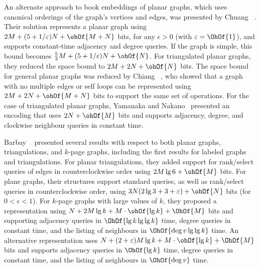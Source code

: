 {An alternate approach to book embeddings of planar graphs, which uses
canonical orderings of the graph's vertices and edges, was presented
by Chuang \etal~\cite{chuang_et_al_1998}.
Their solution represents a planar graph using
$2M + (5 + 1/\epsilon)N + \ohOf{M + N}$ bits, for any $\epsilon > 0$ 
(with $\epsilon = \OhOf{1}$), and supports constant-time adjacency 
and degree queries.
If the graph is simple, this bound becomes
$\frac{5}{3}M + (5 + 1/\epsilon)N + \ohOf{N}$. 
For triangulated planar graphs, they reduced the space
bound to $2M + 2N + \ohOf{N}$ bits.
The space bound for general planar graphs was reduced by Chiang
\etal~\cite{DBLP:journals/siamcomp/ChiangLL05}, who showed that a
graph with no multiple edges or self loops can be represented using
$2M + 2N + \ohOf{M + N}$ bits to support the same set of
operations.
For the case of triangulated planar graphs, Yamanaka and
Nakano~\cite{DBLP:conf/walcom/YamanakaN08} presented an encoding that
uses $2N + \ohOf{M}$ bits and supports adjacency, degree, and
clockwise neighbour queries in constant time.

Barbay \etal~\cite{DBLP:conf/isaac/BarbayAHM07} presented several
results with respect to both planar graphs, triangulations, and
$k$-page graphs, including the first results for labeled graphs and
triangulations.
For planar triangulations, they added support for
rank/select queries of edges in counterclockwise order using $2M
\lg 6 + \ohOf{M}$ bits.
For plane graphs, their structures support
standard queries, as well as rank/select queries in counterclockwise
order, using $3N(2 \lg 3 + 3 + \epsilon) + \ohOf{N}$
bits (for $0 < \epsilon < 1$).
For $k$-page graphs
with large values of $k$, they proposed a representation using $N + 2M
\lg k + M \cdot \ohOf{\lg k} + \OhOf{M}$ bits and supporting
adjacency queries in $\OhOf{\lg k \lg\lg k}$ time, degree queries in
constant time, and the listing of neighbours in $\OhOf{\deg{v} \lg\lg k}$ time.
An alternative representation uses
$N + (2 + \epsilon)M \lg k + M \cdot \ohOf{\lg k} + \OhOf{M}$ bits and
supports adjacency queries in $\OhOf{\lg k}$ time, degree queries in
constant time, and the listing of neighbours in $\OhOf{\deg{v}}$ time.

}
